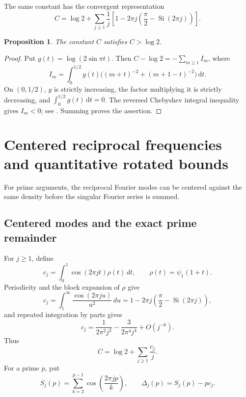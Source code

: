 \documentclass[11pt]{amsart}
\numberwithin{equation}{section}
\newtheorem{proposition}[theorem]{Proposition}
\theoremstyle{definition}
\theoremstyle{remark}
\newcommand{\dd}{\,\mathrm d}
\begin{document}
The same constant has the convergent representation
\begin{equation}\label{eq:C-series}
 C=\log2+\sum_{j\geq1}\frac1j
 \left[1-2\pi j\left(\frac\pi2-\operatorname{Si}(2\pi j)\right)\right].
\end{equation}

\begin{proposition}\label{prop:C-strict}
The constant \(C\) satisfies \(C>\log2\).
\end{proposition}

\begin{proof}
Put \(g(t)=\log(2\sin\pi t)\).  Then
\(C-\log2=-\sum_{m\geq1}I_m\), where
\[
 I_m=\int_0^{1/2}g(t)
 \bigl((m+t)^{-2}+(m+1-t)^{-2}\bigr)\dd t.
\]
On \((0,1/2)\), \(g\) is strictly increasing, the factor multiplying it
is strictly decreasing, and \(\int_0^{1/2}g(t)\dd t=0\).  The reversed
Chebyshev integral inequality gives \(I_m<0\); see
\cite{HardyLittlewoodPolya1952}.  Summing proves the assertion.
\end{proof}


\section{Centered reciprocal frequencies and quantitative rotated bounds}
\label{sec:frequency-centered}

For prime arguments, the reciprocal Fourier modes can be centered against
the same density before the singular Fourier series is summed.

\subsection{Centered modes and the exact prime remainder}

For \(j\ge1\), define
\begin{equation}\label{eq:cj-def}
 c_j=\int_0^1\cos(2\pi jt)\rho(t)\,dt,
 \qquad \rho(t)=\psi_1(1+t).
\end{equation}
Periodicity and the block expansion of \(\rho\) give
\begin{equation}\label{eq:cj-integral}
 c_j=\int_1^\infty\frac{\cos(2\pi ju)}{u^2}\,du
 =1-2\pi j\left(\frac\pi2-\operatorname{Si}(2\pi j)\right),
\end{equation}
and repeated integration by parts gives
\begin{equation}\label{eq:cj-asymptotic}
 c_j=\frac{1}{2\pi^2j^2}-\frac{3}{2\pi^4j^4}+O(j^{-6}).
\end{equation}
Thus
\begin{equation}\label{eq:C-cj}
 C=\log2+\sum_{j\ge1}\frac{c_j}{j}.
\end{equation}
For a prime \(p\), put
\begin{equation}\label{eq:Sj-Deltaj}
 S_j(p)=\sum_{k=2}^{p-1}\cos\!\left(\frac{2\pi jp}{k}\right),
 \qquad \Delta_j(p)=S_j(p)-pc_j.
\end{equation}
\end{document}
